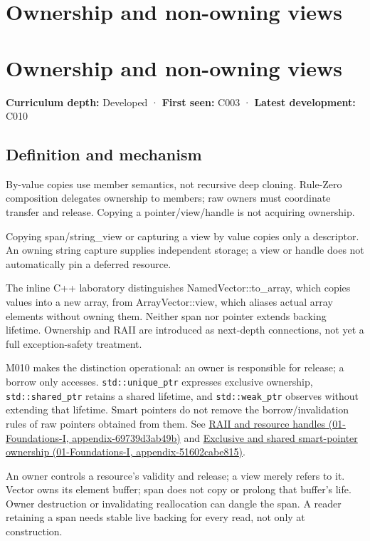 \hypertarget{appendix-d52e4486f527}{}
\section*{Ownership and non-owning views}
\section{Ownership and non-owning views}\label{appendix-d52e4486f527-ownership-and-non-owning-views}

\textbf{Curriculum depth:} Developed · \textbf{First seen:} C003 · \textbf{Latest development:} C010

\subsection{Definition and mechanism}\label{appendix-d52e4486f527-definition-and-mechanism}

By-value copies use member semantics, not recursive deep cloning. Rule-Zero composition delegates ownership to members; raw owners must coordinate transfer and release. Copying a pointer/view/handle is not acquiring ownership.

Copying span/string\_view or capturing a view by value copies only a descriptor. An owning string capture supplies independent storage; a view or handle does not automatically pin a deferred resource.

The inline C++ laboratory distinguishes NamedVector::to\_array, which copies values into a new array, from ArrayVector::view, which aliases actual array elements without owning them. Neither span nor pointer extends backing lifetime. Ownership and RAII are introduced as next-depth connections, not yet a full exception-safety treatment.

M010 makes the distinction operational: an owner is responsible for release; a borrow only accesses. \texttt{std::unique\_ptr} expresses exclusive ownership, \texttt{std::shared\_ptr} retains a shared lifetime, and \texttt{std::weak\_ptr} observes without extending that lifetime. Smart pointers do not remove the borrow/invalidation rules of raw pointers obtained from them. See \href{../01-Foundations-I/main.pdf\#nameddest=appendix-69739d3ab49b}{RAII and resource handles (01-Foundations-I, appendix-69739d3ab49b)} and \href{../01-Foundations-I/main.pdf\#nameddest=appendix-51602cabe815}{Exclusive and shared smart-pointer ownership (01-Foundations-I, appendix-51602cabe815)}.

An owner controls a resource's validity and release; a view merely refers to it. Vector owns its element buffer; span does not copy or prolong that buffer's life. Owner destruction or invalidating reallocation can dangle the span. A reader retaining a span needs stable live backing for every read, not only at construction.

